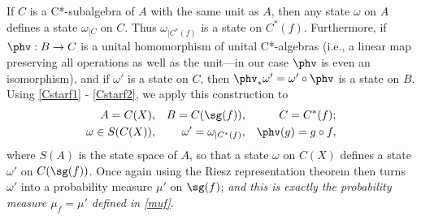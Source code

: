 \documentclass[12pt]{article}
\numberwithin{equation}{section}
\newcommand{\er}{\eqref}
\newcommand{\raw}{\rightarrow}
\newcommand{\om}{\omega} \newcommand{\Om}{\Omega}
\begin{document}
  If $C$ is a C*-subalgebra of $A$ with the same unit as $A$, then any state $\om$ on $A$ defines a state $\om_{|C}$ on $C$. Thus $\om_{|C^*(f)}$ is a state on $C^*(f)$. Furthermore, if $\phv:B\raw C$ is a unital homomorphism of unital C*-algebras (i.e., a linear map preserving all operations as well as the unit---in our case $\phv$ is even an isomorphism), and if $\om'$ is a state on $C$, then $\phv_*\om'= \om'\circ \phv$ is a state on $B$. Using  \er{Cstarf1} - \er{Cstarf2}, we apply this construction to
\begin{align}
A=C(X), && B=C(\sg(f)), && C= C^*(f); \label{CBM1} 
\\  \om\in S(C(X)), && \om'=\om_{|C^*(f)}, && \phv(g)=g\circ f,\label{CBM2}
\end{align}
where $S(A)$ is the state space of $A$,  so that a state $\om$  on $C(X)$  defines a state $\om'$ on $C(\sg(f))$. Once again using the Riesz representation theorem then turns $\om'$ into a probability measure $\mu'$ on $\sg(f)$;  \emph{and this is exactly the probability measure 
 $\mu_f=\mu'$ defined in \er{muf}}.
 
\end{document}
